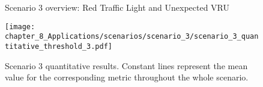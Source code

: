 
\begin{figure}[]
	\centering
	\caption{Scenario 3 overview: Red Traffic Light and Unexpected \ac{VRU}}
	\label{fig:chapter_8_Applications/scenarios/scenario_3/scenario_3_route1_town01_training}
\end{figure}

\begin{figure}[]
	\centering
	\texttt{[image: chapter\_8\_Applications/scenarios/scenario\_3/scenario\_3\_quantitative\_threshold\_3.pdf]}
	\captionsetup{justification=justified}
	\caption[Scenario 3 quantitative results]{Scenario 3 quantitative results. Constant lines represent the mean value for the corresponding metric throughout the whole scenario.}
	\label{fig:chapter_8_Applications/scenarios/scenario_3/scenario_3_quantitative_threshold_3}
\end{figure}

